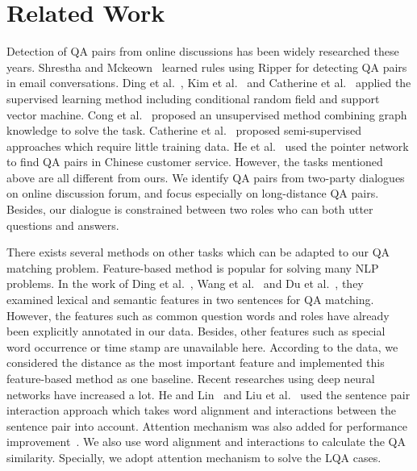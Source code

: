 \section{Related Work}
\label{sec:relatedwork}

 
Detection of QA pairs from online discussions has been widely researched these years. Shrestha and Mckeown~\cite{shrestha2004detection} learned rules using Ripper for detecting QA pairs in email conversations. Ding et al.~\cite{ding2008using}, Kim et al.~\cite{kim2010tagging} and Catherine et al.~\cite{catherine2012does} applied the supervised learning method including conditional random field and support vector machine. Cong et al.~\cite{cong2008finding} proposed an unsupervised method combining graph knowledge to solve the task. Catherine et al.~\cite{catherine2013semi} proposed semi-supervised approaches which require little training data. He et al.~\cite{he2019learning} used the pointer network to find QA pairs in Chinese customer service. 
However, the tasks mentioned above are all different from ours. 
We identify QA pairs from two-party dialogues on online discussion forum, 
and focus especially on long-distance QA pairs. Besides, our 
dialogue is constrained between two roles who can both utter questions and  answers.


There exists several methods on other tasks which can be adapted to 
our QA matching problem. Feature-based method is popular for solving 
many NLP problems. In the work of Ding et al.~\cite{ding2008using}, 
Wang et al.~\cite{wang2010modeling} and 
Du et al.~\cite{du2017discovering}, 
they examined lexical and semantic features in two sentences 
for QA matching. However, the features such as common question words 
and roles have already been explicitly annotated in our data. 
Besides, other features such as special word occurrence or time stamp are 
unavailable here. According to the data, we considered the distance as 
the most important feature and implemented this feature-based method as one 
baseline. Recent researches using deep neural networks have increased a lot. 
He and Lin~\cite{he2016pairwise} and 
Liu et al.~\cite{liu2016modelling} used the sentence pair interaction 
approach which takes word alignment and interactions between the sentence 
pair into account. Attention mechanism was also added for performance 
improvement~\cite{rocktaschel2015reasoning,wang2016learning,chen2017enhanced}. 
We also use word alignment and interactions to calculate the QA similarity. 
Specially, we adopt attention mechanism to solve the LQA cases.

